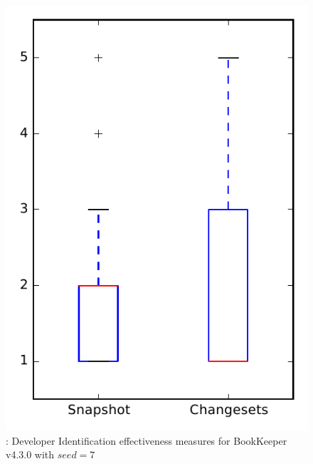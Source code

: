 
\begin{figure}
\centering
\includegraphics[height=0.4\textheight]{figures/dit_seed/rq1_bookkeeper_7}
\caption{\rtwo: Developer Identification effectiveness measures for BookKeeper v4.3.0 with $seed=7$}
\label{fig:dit_seed:rq1:bookkeeper}
\end{figure}
